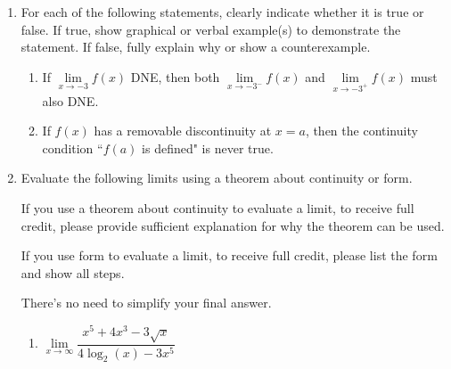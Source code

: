 \documentclass[11pt]{article}
\begin{document}
\begin{enumerate}

\newpage


\item For each of the following statements, clearly indicate whether it is true or false. If true, show graphical or verbal example(s) to demonstrate the statement. If false, fully explain why or show a counterexample.

\begin{enumerate}
    \item If $\lim\limits_{x\to -3}f(x)$ DNE, then both $\lim\limits_{x\to -3^-}f(x)$ and $\lim\limits_{x\to -3^+}f(x)$ must also DNE.

    \vfill

    \item If $f(x)$ has a removable discontinuity at $x=a$, then the continuity condition ``$f(a)$ is defined" is never true.

    \vfill
\end{enumerate}


\newpage


\item Evaluate the following limits using a theorem about continuity or form.

If you use a theorem about continuity to evaluate a limit, to receive full credit, please provide sufficient explanation for why the theorem can be used. 

If you use form to evaluate a limit, to receive full credit, please list the form and show all steps. 

There's no need to simplify your final answer.

\begin{enumerate}
    \item $\lim\limits_{x\to\infty}\dfrac{x^5+4x^3-3\sqrt{x}}{4\log_2(x)-3x^5}$


\end{enumerate}
\end{enumerate}
\end{document}
